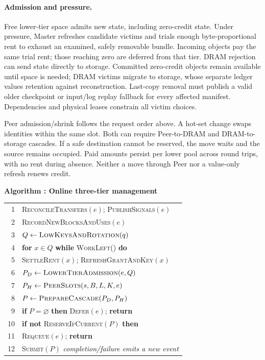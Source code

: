 \paragraph{Admission and pressure.}
Free lower-tier space admits new state, including zero-credit state.
Under pressure, Master refreshes candidate victims and trials enough
byte-proportional rent to exhaust an examined, safely removable bundle.
Incoming objects pay the same trial rent; those reaching zero are deferred
from that tier. DRAM rejection can send state directly to storage.
Committed zero-credit objects remain available until space is needed;
DRAM victims migrate to storage, whose separate ledger values retention
against reconstruction. Last-copy removal must publish a valid older
checkpoint or input/log replay fallback for every affected manifest.
Dependencies and physical leases constrain all victim choices.

Peer admission/shrink follows the request order above. A hot-set change
swaps identities within the same slot. Both can require Peer-to-DRAM and
DRAM-to-storage cascades. If a safe destination cannot be reserved, the
move waits and the source remains occupied. Paid amounts persist per
lower pool across round trips, with no rent during absence. Neither a
move through Peer nor a value-only refresh renews credit.

\par\medskip\noindent\begin{minipage}{\columnwidth}
\raggedright
 \label{alg:placement}
 \textbf{Algorithm \thedesignalgorithm: Online three-tier management}
 \par\smallskip
 \begin{tabularx}{\columnwidth}{@{}r@{\quad}X@{}}
 \toprule
 1 & \textsc{ReconcileTransfers}$(e)$; \textsc{PublishSignals}$(e)$ \\
 2 & \textsc{RecordNewBlocksAndUses}$(e)$ \\
 3 & $Q\gets\textsc{LowKeysAndRotation}(q)$ \\
 4 & \textbf{for} $x\in Q$ \textbf{while} \textsc{WorkLeft}() \textbf{do} \\
 5 & \quad \textsc{SettleRent}$(x)$; \textsc{RefreshGrantAndKey}$(x)$ \\
 6 & $P_D\gets\textsc{LowerTierAdmission}(e,Q)$ \\
 7 & $P_H\gets\textsc{PeerSlots}(s,B,L,K,e)$ \\
 8 & $P\gets\textsc{PrepareCascade}(P_D,P_H)$ \\
 9 & \textbf{if} $P=\varnothing$ \textbf{then} \textsc{Defer}$(e)$; \textbf{return} \\
 10 & \textbf{if not} \textsc{ReserveIfCurrent}$(P)$ \textbf{then} \\
 11 & \quad \textsc{Requeue}$(e)$; \textbf{return} \\
 12 & \textsc{Submit}$(P)$ \quad\textit{completion/failure emits a new event} \\
 \bottomrule
 \end{tabularx}
\end{minipage}\par\medskip

